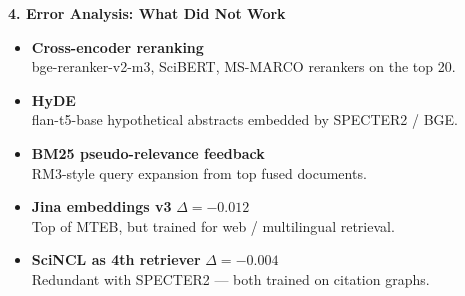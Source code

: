 \documentclass[aspectratio=169, 12pt]{beamer}
\begin{document}
\begin{frame}{\textbf{4. Error Analysis: What Did Not Work}}
\begin{itemize}
    \item \textbf{\textcolor{failure}{Cross-encoder reranking}}\\
    \footnotesize bge-reranker-v2-m3, SciBERT, MS-MARCO rerankers on the top 20.
    \vspace{0.3em}

    \item \textbf{\textcolor{failure}{HyDE}}\\
    \footnotesize flan-t5-base hypothetical abstracts embedded by SPECTER2 / BGE.
    \vspace{0.3em}

    \item \textbf{\textcolor{failure}{BM25 pseudo-relevance feedback}}\\
    \footnotesize RM3-style query expansion from top fused documents.
    \vspace{0.3em}

    \item \textbf{\textcolor{failure}{Jina embeddings v3}} \hfill $\Delta = -0.012$\\
    \footnotesize Top of MTEB, but trained for web / multilingual retrieval.
    \vspace{0.3em}

    \item \textbf{\textcolor{failure}{SciNCL as 4th retriever}} \hfill $\Delta = -0.004$\\
    \footnotesize Redundant with SPECTER2 — both trained on citation graphs.
\end{itemize}
\end{frame}
\end{document}
